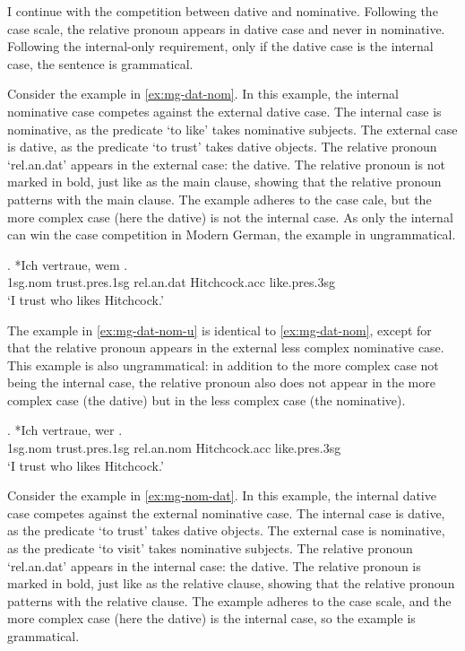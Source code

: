 I continue with the competition between dative and nominative. Following the case scale, the relative pronoun appears in dative case and never in nominative. Following the internal-only requirement, only if the dative case is the internal case, the sentence is grammatical.

Consider the example in \ref{ex:mg-dat-nom}. In this example, the internal nominative case competes against the external dative case.
The internal case is nominative, as the predicate  `to like' takes nominative subjects.
The external case is dative, as the predicate  `to trust' takes dative objects.
The relative pronoun  `\ac{rel}.\ac{an}.\ac{dat}' appears in the external case: the dative. The relative pronoun is not marked in bold, just like as the main clause, showing that the relative pronoun patterns with the main clause.
The example adheres to the case cale, but the more complex case (here the dative) is not the internal case. As only the internal can win the case competition in Modern German, the example in ungrammatical.

\exg. *Ich vertraue, wem  .\\
1\ac{sg}.\ac{nom} trust.\ac{pres}.1\ac{sg}\scsub{[dat]} \ac{rel}.\ac{an}.\ac{dat} Hitchcock.\ac{acc} like.\ac{pres}.3\ac{sg}\scsub{[nom]}\\
`I trust who likes Hitchcock.' \label{ex:mg-dat-nom}

The example in \ref{ex:mg-dat-nom-u} is identical to \ref{ex:mg-dat-nom}, except for that the relative pronoun appears in the external less complex nominative case. This example is also ungrammatical: in addition to the more complex case not being the internal case, the relative pronoun also does not appear in the more complex case (the dative) but in the less complex case (the nominative).

\exg. *Ich vertraue, wer  .\\
1\ac{sg}.\ac{nom} trust.\ac{pres}.1\ac{sg}\scsub{[dat]} \ac{rel}.\ac{an}.\ac{nom} Hitchcock.\ac{acc} like.\ac{pres}.3\ac{sg}\scsub{[nom]}\\
`I trust who likes Hitchcock.' \label{ex:mg-dat-nom-u}

Consider the example in \ref{ex:mg-nom-dat}. In this example, the internal dative case competes against the external nominative case.
The internal case is dative, as the predicate  `to trust' takes dative objects.
The external case is nominative, as the predicate  `to visit' takes nominative subjects.
The relative pronoun  `\ac{rel}.\ac{an}.\ac{dat}' appears in the internal case: the dative. The relative pronoun is marked in bold, just like as the relative clause, showing that the relative pronoun patterns with the relative clause.
The example adheres to the case scale, and the more complex case (here the dative) is the internal case, so the example is grammatical.

